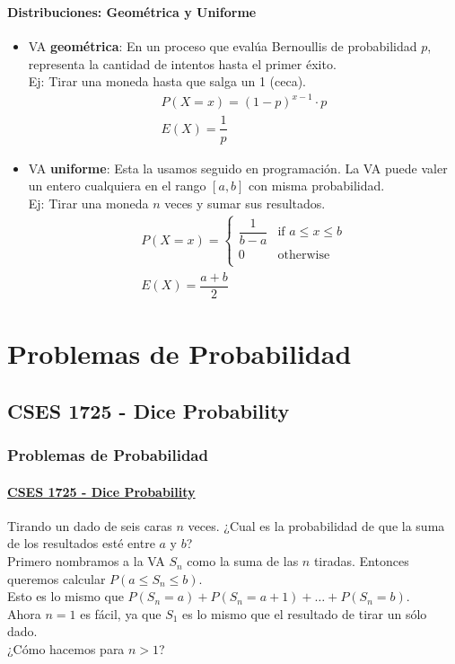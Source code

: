 \documentclass{beamer}
\begin{document}
\begin{frame}
  \frametitle{\SECTIONA}
  \framesubtitle{Distribuciones: Geométrica y Uniforme}

  \begin{itemize}
    \item VA \textbf{geométrica}: En un proceso que evalúa Bernoullis de probabilidad \(p\), representa la cantidad de intentos hasta el primer éxito. \\
      Ej: Tirar una moneda hasta que salga un 1 (ceca).
      \begin{gather*}
        P(X = x) = (1 - p)^{x - 1} \cdot p \\
        E(X) = \dfrac{1}{p}
      \end{gather*}
    \item<2-> VA \textbf{uniforme}: Esta la usamos seguido en programación. La VA puede valer un entero cualquiera en el rango \([a, b]\) con misma probabilidad. \\
      Ej: Tirar una moneda \(n\) veces y sumar sus resultados.
      \begin{gather*}
        P(X = x) = \begin{cases} \dfrac{1}{b - a} & \text{if } a \leq x \leq b \\ 0 & \text{otherwise} \\ \end{cases} \\
        E(X) = \dfrac{a + b}{2}
      \end{gather*}
  \end{itemize}
\end{frame}

\newcommand{\SECTIONB}{Problemas de Probabilidad}
\section{\SECTIONB}
\newcommand{\EJA}{\href{https://cses.fi/problemset/task/1725/}{CSES 1725 - Dice Probability}}

\subsection{CSES 1725 - Dice Probability}

\begin{frame}
  \frametitle{\SECTIONB}
  \framesubtitle{\EJA}

  Tirando un dado de seis caras \(n\) veces. ¿Cual es la probabilidad de que la suma de los resultados esté entre \(a\) y \(b\)? \pause \\
  Primero nombramos a la VA \(S_{n}\) como la suma de las \(n\) tiradas. Entonces queremos calcular \(P(a \leq S_{n} \leq b)\). \pause \\
  Esto es lo mismo que \(P(S_{n} = a) + P(S_{n} = a+1) + \ldots + P(S_{n} = b)\). \pause \\
  Ahora \(n = 1\) es fácil, ya que \(S_{1}\) es lo mismo que el resultado de tirar un sólo dado. \\
  ¿Cómo hacemos para \(n > 1\)?

\end{frame}
\end{document}
